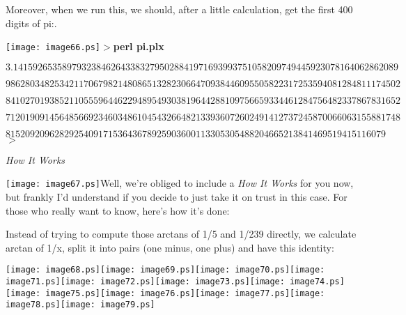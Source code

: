 \documentclass[a4paper,11pt]{book}
\begin{document}
\noindent 

\noindent Moreover, when we run this, we should, after a little calculation, get the first 400 digits of pi:.

\noindent 

\noindent \texttt{[image: image66.ps]}$>$\textbf{perl pi.plx}

\[3.1415926535897932384626433832795028841971693993751058209749445923078164062862089\] 

\[986280348253421170679821480865132823066470938446095505822317253594081284811174502\] 

\[841027019385211055596446229489549303819644288109756659334461284756482337867831652\] 

\[712019091456485669234603486104543266482133936072602491412737245870066063155881748\] 

\[815209209628292540917153643678925903600113305305488204665213841469519415116079\] 
$>$

\noindent 

\noindent \textit{How It Works}

\noindent \texttt{[image: image67.ps]}Well, we're obliged to include a \textit{How It Works }for you now, but frankly I'd understand if you decide to just take it on trust in this case. For those who really want to know, here's how it's done:

\noindent 

\noindent Instead of trying to compute those arctans of 1/5 and 1/239 directly, we calculate arctan of 1/x, split it into pairs (one minus, one plus) and have this identity:

\noindent 

\noindent 

\noindent \texttt{[image: image68.ps]}\texttt{[image: image69.ps]}\texttt{[image: image70.ps]}\texttt{[image: image71.ps]}\texttt{[image: image72.ps]}\texttt{[image: image73.ps]}\texttt{[image: image74.ps]}\texttt{[image: image75.ps]}\texttt{[image: image76.ps]}\texttt{[image: image77.ps]}\texttt{[image: image78.ps]}\texttt{[image: image79.ps]}
\end{document}

